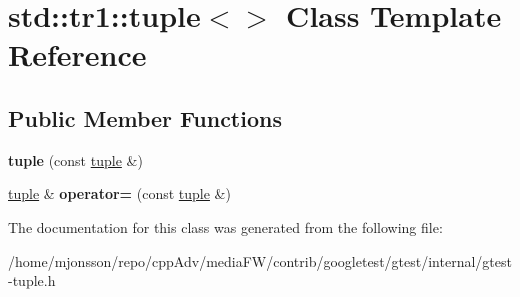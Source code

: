 \hypertarget{classstd_1_1tr1_1_1tuple_3_4}{}\section{std\+:\+:tr1\+:\+:tuple$<$$>$ Class Template Reference}
\label{classstd_1_1tr1_1_1tuple_3_4}
\subsection*{Public Member Functions}
\begin{DoxyCompactItemize}
\item 
\mbox{\label{classstd_1_1tr1_1_1tuple_3_4_aa857599acb126134e29dc5e53fd9d1a7}} 
{\bfseries tuple} (const \hyperlink{classstd_1_1tr1_1_1tuple}{tuple} \&)
\item 
\mbox{\label{classstd_1_1tr1_1_1tuple_3_4_a93ddab6f662662fc49635608619150c8}} 
\hyperlink{classstd_1_1tr1_1_1tuple}{tuple} \& {\bfseries operator=} (const \hyperlink{classstd_1_1tr1_1_1tuple}{tuple} \&)
\end{DoxyCompactItemize}


The documentation for this class was generated from the following file\+:\begin{DoxyCompactItemize}
\item 
/home/mjonsson/repo/cpp\+Adv/media\+F\+W/contrib/googletest/gtest/internal/gtest-\/tuple.\+h\end{DoxyCompactItemize}
